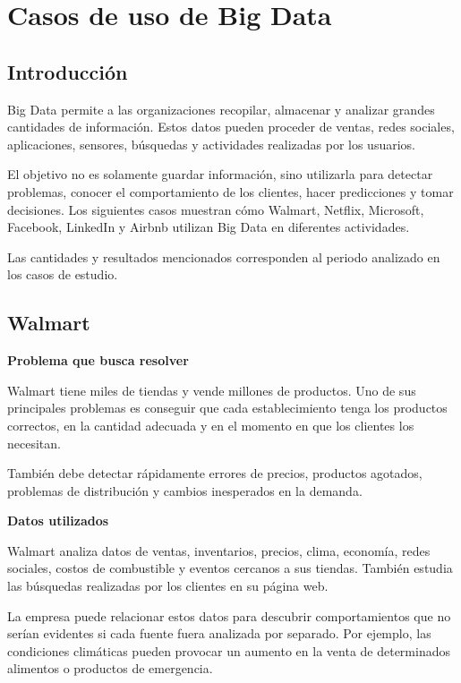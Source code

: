 
\section{Casos de uso de Big Data}

\subsection{Introducción}

Big Data permite a las organizaciones recopilar, almacenar y analizar grandes cantidades de información. Estos datos pueden proceder de ventas, redes sociales, aplicaciones, sensores, búsquedas y actividades realizadas por los usuarios.

El objetivo no es solamente guardar información, sino utilizarla para detectar problemas, conocer el comportamiento de los clientes, hacer predicciones y tomar decisiones. Los siguientes casos muestran cómo Walmart, Netflix, Microsoft, Facebook, LinkedIn y Airbnb utilizan Big Data en diferentes actividades.

Las cantidades y resultados mencionados corresponden al periodo analizado en los casos de estudio.

\subsection{Walmart}

\textbf{Problema que busca resolver}

Walmart tiene miles de tiendas y vende millones de productos. Uno de sus principales problemas es conseguir que cada establecimiento tenga los productos correctos, en la cantidad adecuada y en el momento en que los clientes los necesitan.

También debe detectar rápidamente errores de precios, productos agotados, problemas de distribución y cambios inesperados en la demanda.

\textbf{Datos utilizados}

Walmart analiza datos de ventas, inventarios, precios, clima, economía, redes sociales, costos de combustible y eventos cercanos a sus tiendas. También estudia las búsquedas realizadas por los clientes en su página web.

La empresa puede relacionar estos datos para descubrir comportamientos que no serían evidentes si cada fuente fuera analizada por separado. Por ejemplo, las condiciones climáticas pueden provocar un aumento en la venta de determinados alimentos o productos de emergencia.

